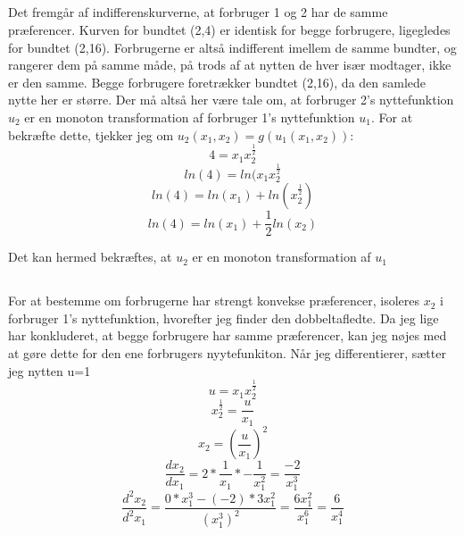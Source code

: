 \documentclass{article}
\begin{document}
\subsection{}
Det fremgår af indifferenskurverne, at forbruger 1 og 2 har de samme præferencer. Kurven for bundtet (2,4) er identisk for begge forbrugere, ligegledes for bundtet (2,16). Forbrugerne er altså indifferent imellem de samme bundter, og rangerer dem på samme måde, på trods af at nytten de hver især modtager, ikke er den samme. Begge forbrugere foretrækker bundtet (2,16), da den samlede nytte her er større. Der må altså her være tale om, at forbruger 2's nyttefunktion $u_2$ er en monoton transformation af forbruger 1's nyttefunktion $u_1$. For at bekræfte dette, tjekker jeg om $u_2(x_1,x_2)=g(u_1(x_1,x_2))$:
\begin{equation}
    4 = x_1x_2^\frac{1}{2}
\end{equation}
\begin{equation}
    ln(4)=ln(x_1x_2^\frac{1}{2}
\end{equation}
\begin{equation}
    ln(4)=ln(x_1)+ln(x_2^\frac{1}{2})
\end{equation}
\begin{equation}
    ln(4)=ln(x_1)+\frac{1}{2}ln(x_2)
\end{equation}

Det kan hermed bekræftes, at $u_2$ er en monoton transformation af $u_1$

\subsection{}
For at bestemme om forbrugerne har strengt konvekse præferencer, isoleres $x_2$ i forbruger 1's nyttefunktion, hvorefter jeg finder den dobbeltafledte. Da jeg lige har konkluderet, at begge forbrugere har samme præferencer, kan jeg nøjes med at gøre dette for den ene forbrugers nyytefunkiton. Når jeg differentierer, sætter jeg nytten u=1
\begin{equation}
    u=x_1x_2^{\frac{1}{2}}
\end{equation}
\begin{equation}
    x_2^{\frac{1}{2}}=\frac{u}{x_1}
\end{equation}
\begin{equation}
    x_2=(\frac{u}{x_1})^2
\end{equation}
\begin{equation}
    \frac{dx_2}{dx_1}=2*\frac{1}{x_1}*-\frac{1}{x_1^2}=\frac{-2}{x_1^3}
\end{equation}
\begin{equation}
    \frac{d^2x_2}{d^2x_1}=\frac{0*x_1^3-(-2)*3x_1^2}{(x_1^3)^2}=\frac{6x_1^2}{x_1^6}=\frac{6}{x_1^4}
\end{equation}
\end{document}
